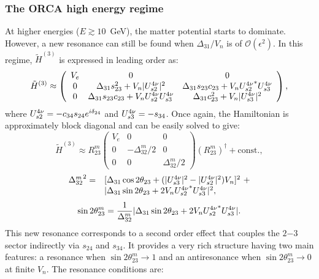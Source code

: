 \subsubsection{The ORCA high energy regime}
\label{sec:high-E}
At higher energies ($E\gtrsim10$~GeV), the matter potential starts to dominate. However, a new resonance can still be found when $\Delta_{31}/V_n$ is of $\mathcal{O}(\epsilon^2)$. In this regime, $\tilde{H}^{(3)}$ is expressed in leading order as:
\begin{equation}
    \tilde{H}^{(3)} \approx 
    \left(\begin{array}{ccc}
        V_e & 0 & 0 \\
        0 & \Delta_{31}s_{23}^2+V_n |U^{4\nu}_{s2}|^2 & \Delta_{31}s_{23}c_{23}+V_n {U^{4\nu}_{s2}}^*U^{4\nu}_{s3} \\
        0 & \Delta_{31}s_{23}c_{23}+V_n U^{4\nu}_{s2}U^{4\nu}_{s3} & \Delta_{31}c_{23}^2+V_n|U^{4\nu}_{s3}|^2
    \end{array}\right) ,
\end{equation}
where $U^{4\nu}_{s2}=-c_{34}s_{24}e^{i\delta_{24}}$ and $U^{4\nu}_{s3}=-s_{34}$. Once again, the Hamiltonian is approximately block diagonal and can be easily solved to give:
\begin{equation}
    \tilde{H}^{(3)} \approx R_{23}^m
    \left(\begin{array}{ccc}
        V_e & 0 & 0 \\
        0 & -\Delta_{32}^m/2 & 0 \\
        0 & 0 & \Delta_{32}^m/2
    \end{array}\right) (R_{23}^m)^\dagger+\mathrm{const.},
\end{equation}
\begin{equation}
    \begin{array}{rl}
    {\Delta_{32}^m}^2 = &[\Delta_{31}\cos2\theta_{23}+(|\UNP_{s3}|^2-|\UNP_{s2}|^2)V_n]^2\ +\\
    &|\Delta_{31}\sin2\theta_{23}+2V_n {\UNP_{s2}}^*\UNP_{s3}|^2 ,
    \end{array}
\end{equation}
\begin{equation}
    \sin2\theta_{23}^m = \frac{1}{\Delta_{32}^m}|\Delta_{31}\sin2\theta_{23}+2V_n{U^{4\nu}_{s2}}^*U^{4\nu}_{s3}| .
\end{equation}
This new resonance corresponds to a second order effect that couples the $2\mathrm{-}3$ sector indirectly via $s_{24}$ and $s_{34}$. It provides a very rich structure having two main features: a resonance when $\sin2\theta_{23}^m\rightarrow1$ and an antiresonance when $\sin2\theta_{23}^m\rightarrow0$ at finite $V_n$. The resonance conditions are:
